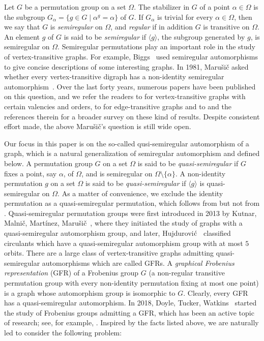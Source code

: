 \documentclass[12pt,reqno]{amsart}
\renewcommand\a{\alpha}  \renewcommand\b{\beta}
\numberwithin {equation} {section}
\begin{document}
Let $G$ be a permutation group on a set $\Omega$. The stabilizer in $G$ of a point $\a\in\Omega$ is
the subgroup $G_\a=\{g\in G \mid \a^g=\a\}$ of $G$. If $G_\a$ is trivial for every $\a\in\Omega$, then we say that $G$ is \emph{semiregular} on $\Omega$, and \emph{regular} if in addition $G$ is transitive on $\Omega$. An element $g$ of $G$ is said to be \emph{semiregular} if $\langle g \rangle$, the subgroup generated by $g$, is semiregular on $\Omega$. Semiregular permutations play an important role in the study of  vertex-transitive graphs. For example, Biggs~\cite{Biggs-graphs}  used semiregular automorphisms to give concise descriptions of some interesting graphs. In 1981, Maru\v{s}i\v{c} asked whether every vertex-transitive digraph has a non-identity semiregular automorphism~\cite[Problem~2.4]{M81}.  Over the last forty years, numerous papers have been published on this question, and we refer the readers to \cite{CSS,DMMN,GV,Li,M2018,M2017,MS,MSV,Ro} for vertex-transitive graphs with certain valencies and orders, to \cite{FengHKKM,GPV,GX,KS,V,Xu} for edge-transitive graphs and to \cite[Section~1]{B-G} and the references therein for a broader survey on these kind of results. Despite consistent effort made, the above Maru\v{s}i\v{c}'s question is still wide open.

Our focus in this paper is on the so-called qusi-semiregular automorphism of a graph, which is a natural generalization of semiregular automorphism and defined below. A permutation group $G$ on a set $\Omega$ is said to be \emph{quasi-semiregular} if $G$ fixes a point, say $\a$, of $\Omega$, and is semiregular on $\Omega\setminus \{\a\}$. A non-identity permutation $g$ on a set $\Omega$ is said to be \emph{quasi-semiregular} if $\langle g \rangle$ is quasi-semiregular on $\Omega$.
As a matter of convenience, we exclude the identity permutation as a quasi-semiregular permutation, which follows from \cite{FengHKKM,YF} but not from \cite{Hu,KMMM}.
Quasi-semiregular permutation groups were first introduced in 2013 by Kutnar, Malni\v{c}, Mart\'{i}nez,  Maru\v{s}i\v{c}~\cite{KMMM}, where they initiated the study of graphs with a quasi-semiregular automorphism group, and later, Hujdurovi$\acute{\rm c}$~\cite{Hu} classified circulants which have a quasi-semiregular automorphism group with at most $5$ orbits. There are a large class of vertex-transitive graphs admitting quasi-semiregular automorphisms which are called GFRs. A \emph{graphical Frobenius representation} (GFR) of a Frobenius group $G$ (a non-regular transitive permutation group with every non-identity permutation fixing at most one point) is a graph whose automorphism group is isomorphic to $G$. Clearly, every GFR has a quasi-semiregular automorphism. In 2018, Doyle, Tucker, Watkins~\cite{GFR} started the study of Frobenius groups admitting a GFR, which has been an active topic of research; see, for example, \cite{KN,Spiga1,Spiga2}. Inspired by the facts listed above, we are naturally led to consider the following problem:
\end{document}
